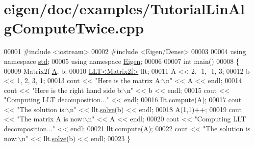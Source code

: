 \hypertarget{eigen_2doc_2examples_2_tutorial_lin_alg_compute_twice_8cpp_source}{}\section{eigen/doc/examples/\+Tutorial\+Lin\+Alg\+Compute\+Twice.cpp}
\label{eigen_2doc_2examples_2_tutorial_lin_alg_compute_twice_8cpp_source}

\begin{DoxyCode}
00001 \textcolor{preprocessor}{#include <iostream>}
00002 \textcolor{preprocessor}{#include <Eigen/Dense>}
00003 
00004 \textcolor{keyword}{using namespace }\hyperlink{namespacestd}{std};
00005 \textcolor{keyword}{using namespace }\hyperlink{namespace_eigen}{Eigen};
00006 
00007 \textcolor{keywordtype}{int} main()
00008 \{
00009    Matrix2f \hyperlink{group___core___module_class_eigen_1_1_matrix}{A}, b;
00010    \hyperlink{group___cholesky___module_class_eigen_1_1_l_l_t}{LLT<Matrix2f>} llt;
00011    A << 2, -1, -1, 3;
00012    b << 1, 2, 3, 1;
00013    cout << \textcolor{stringliteral}{"Here is the matrix A:\(\backslash\)n"} << A << endl;
00014    cout << \textcolor{stringliteral}{"Here is the right hand side b:\(\backslash\)n"} << b << endl;
00015    cout << \textcolor{stringliteral}{"Computing LLT decomposition..."} << endl;
00016    llt.compute(A);
00017    cout << \textcolor{stringliteral}{"The solution is:\(\backslash\)n"} << llt.\hyperlink{group___cholesky___module_a3738bb3ce6f9b837a2beb432b937499f}{solve}(b) << endl;
00018    A(1,1)++;
00019    cout << \textcolor{stringliteral}{"The matrix A is now:\(\backslash\)n"} << A << endl;
00020    cout << \textcolor{stringliteral}{"Computing LLT decomposition..."} << endl;
00021    llt.compute(A);
00022    cout << \textcolor{stringliteral}{"The solution is now:\(\backslash\)n"} << llt.\hyperlink{group___cholesky___module_a3738bb3ce6f9b837a2beb432b937499f}{solve}(b) << endl;
00023 \}
\end{DoxyCode}
